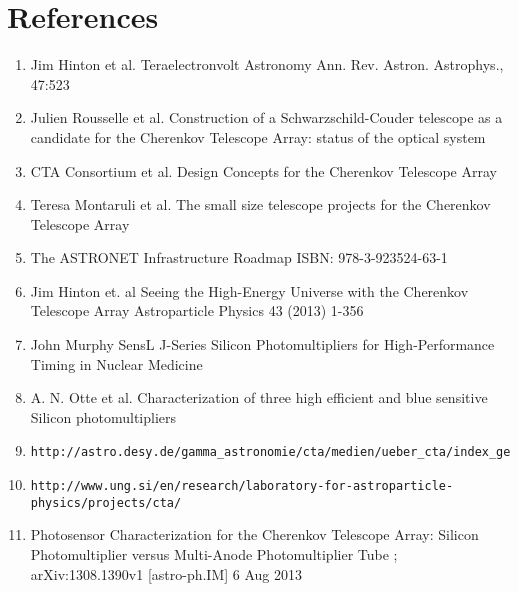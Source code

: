 \documentclass[article,type=msc,colorback,accentcolor=tud9c]{tudthesis}
\begin{document}
\section{References}
\begin{enumerate}
\item Jim Hinton et al. Teraelectronvolt Astronomy Ann. Rev. Astron. Astrophys., 47:523
\item Julien Rousselle et al. Construction of a Schwarzschild-Couder telescope as a candidate for the Cherenkov Telescope Array: status of the optical system
\item CTA Consortium et al. Design Concepts for the Cherenkov Telescope Array
\item Teresa Montaruli et al. The small size telescope projects for the Cherenkov Telescope Array
\item The ASTRONET Infrastructure Roadmap ISBN: 978-3-923524-63-1
\item Jim Hinton et. al Seeing the High-Energy Universe with the Cherenkov Telescope Array Astroparticle Physics 43 (2013) 1-356 
\item John Murphy SensL J-Series Silicon Photomultipliers for High-Performance Timing in Nuclear Medicine 
\item A. N. Otte et al. Characterization of three high efficient and blue sensitive Silicon photomultipliers
\item \begin{verbatim}http://astro.desy.de/gamma_astronomie/cta/medien/ueber_cta/index_ger.html\end{verbatim}
\item \label{ref10}\begin{verbatim}http://www.ung.si/en/research/laboratory-for-astroparticle-physics/projects/cta/\end{verbatim}
\item \label{ref:ref11}Photosensor Characterization for the Cherenkov Telescope Array: Silicon Photomultiplier versus Multi-Anode Photomultiplier Tube ; arXiv:1308.1390v1 [astro-ph.IM] 6 Aug 2013
\end{enumerate}
\end{document}
